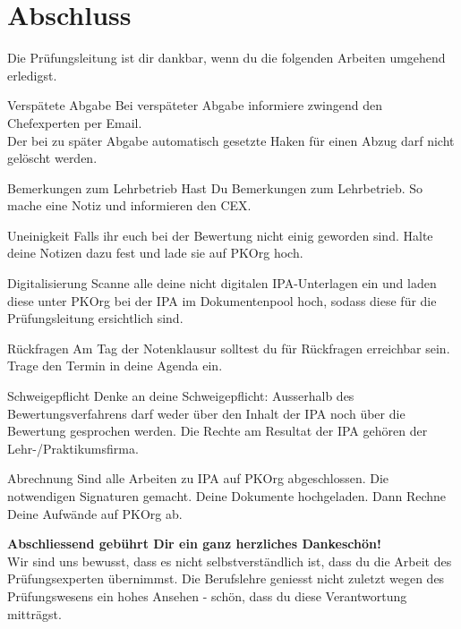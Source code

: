\section{Abschluss}
Die Prüfungsleitung ist dir dankbar, wenn du die folgenden Arbeiten umgehend erledigst.

\begin{taskitemwithoutcomment}{Verspätete Abgabe}
  Bei verspäteter Abgabe informiere zwingend den Chefexperten per Email.\\Der bei zu später Abgabe automatisch gesetzte Haken für einen Abzug darf nicht gelöscht werden.
\end{taskitemwithoutcomment}\begin{taskitemwithoutcomment}{Bemerkungen zum Lehrbetrieb}
  Hast Du Bemerkungen zum Lehrbetrieb. So mache eine Notiz und informieren den CEX.
\end{taskitemwithoutcomment}
\begin{taskitemwithoutcomment}{Uneinigkeit}
  Falls ihr euch bei der Bewertung nicht einig geworden sind. Halte deine Notizen dazu fest und lade sie auf PKOrg hoch.
\end{taskitemwithoutcomment}
\begin{taskitemwithoutcomment}{Digitalisierung}
  Scanne alle deine nicht digitalen IPA-Unterlagen ein und laden diese unter PKOrg bei der IPA im Dokumentenpool hoch, sodass diese für die Prüfungsleitung ersichtlich sind.
\end{taskitemwithoutcomment}
\begin{taskitemwithoutcomment}{Rückfragen}
  Am Tag der Notenklausur solltest du für Rückfragen erreichbar sein. Trage den Termin in deine Agenda ein.
\end{taskitemwithoutcomment}
\begin{taskitemwithoutcomment}{Schweigepflicht}
  Denke an deine Schweigepflicht: Ausserhalb des Bewertungsverfahrens darf weder über den Inhalt der IPA noch über die Bewertung gesprochen werden. Die Rechte am Resultat der IPA gehören der Lehr-/Praktikumsfirma.
\end{taskitemwithoutcomment}
\begin{taskitemwithoutcomment}{Abrechnung}
  Sind alle Arbeiten zu IPA auf PKOrg abgeschlossen. Die notwendigen Signaturen gemacht. Deine Dokumente hochgeladen. Dann Rechne Deine Aufwände auf PKOrg ab.
\end{taskitemwithoutcomment}

\vspace*{2cm}

\textbf{Abschliessend gebührt Dir ein ganz herzliches Dankeschön!}\\Wir sind uns bewusst, dass es nicht selbstverständlich ist, dass du die Arbeit des Prüfungsexperten übernimmst. Die Berufslehre geniesst nicht zuletzt wegen des Prüfungswesens ein hohes Ansehen - schön, dass du diese Verantwortung mitträgst.
